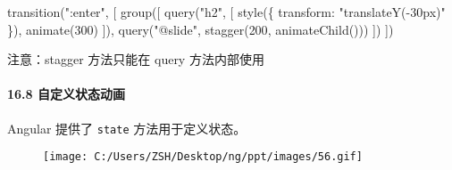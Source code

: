 \documentclass[
]{article}
\newenvironment{Shaded}{}{}
\newcommand{\DataTypeTok}[1]{\textcolor[rgb]{0.56,0.13,0.00}{#1}}
\newcommand{\DecValTok}[1]{\textcolor[rgb]{0.25,0.63,0.44}{#1}}
\newcommand{\FunctionTok}[1]{\textcolor[rgb]{0.02,0.16,0.49}{#1}}
\newcommand{\NormalTok}[1]{#1}
\newcommand{\OperatorTok}[1]{\textcolor[rgb]{0.40,0.40,0.40}{#1}}
\newcommand{\StringTok}[1]{\textcolor[rgb]{0.25,0.44,0.63}{#1}}
\begin{document}
\begin{Shaded}
\begin{Highlighting}[]
\FunctionTok{transition}\NormalTok{(}\StringTok{":enter"}\OperatorTok{,}\NormalTok{ [}
  \FunctionTok{group}\NormalTok{([}
    \FunctionTok{query}\NormalTok{(}\StringTok{"h2"}\OperatorTok{,}\NormalTok{ [}
      \FunctionTok{style}\NormalTok{(\{ }\DataTypeTok{transform}\OperatorTok{:} \StringTok{"translateY({-}30px)"}\NormalTok{ \})}\OperatorTok{,}
      \FunctionTok{animate}\NormalTok{(}\DecValTok{300}\NormalTok{)}
\NormalTok{    ])}\OperatorTok{,}
    \FunctionTok{query}\NormalTok{(}\StringTok{"@slide"}\OperatorTok{,} \FunctionTok{stagger}\NormalTok{(}\DecValTok{200}\OperatorTok{,} \FunctionTok{animateChild}\NormalTok{()))}
\NormalTok{  ])}
\NormalTok{])}
\end{Highlighting}
\end{Shaded}

注意：stagger 方法只能在 query 方法内部使用

\hypertarget{168-ux81eaux5b9aux4e49ux72b6ux6001ux52a8ux753b}{%
\paragraph{16.8
自定义状态动画}\label{168-ux81eaux5b9aux4e49ux72b6ux6001ux52a8ux753b}}

Angular 提供了 \texttt{state} 方法用于定义状态。

\begin{figure}
\centering
\texttt{[image: C:/Users/ZSH/Desktop/ng/ppt/images/56.gif]}
\caption{}
\end{figure}
\end{document}
